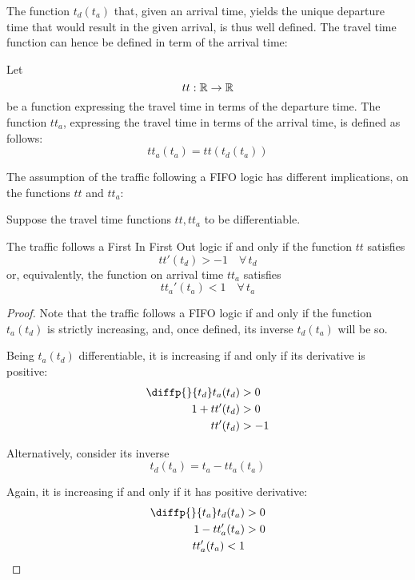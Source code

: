The function \(t_d(t_a)\) that, given an arrival time,
yields the unique departure time that would result in the given arrival,
is thus well defined.
The travel time function can hence be defined in term of the arrival time:
\begin{definition}
  \label{def:tta}
  Let
  \begin{equation*}
    tt:\mathbb{R} \rightarrow \mathbb{R}
  \end{equation*}
  be a function expressing the travel time in terms of the departure time.
  The function \(tt_a\), expressing the travel time in terms of the arrival time, is defined as follows:
  \begin{equation*}
    tt_a(t_a) = tt(t_d(t_a))
  \end{equation*}
\end{definition}

The assumption of the traffic following a FIFO logic has different implications,
on the functions \(tt\) and \(tt_a\):

\begin{lemma}
  \label{lemma:bounded-der-tt}
  Suppose the travel time functions \(tt, tt_a\) to be differentiable.
  
  The traffic follows a First In First Out logic if and only if the function \(tt\) satisfies
  \begin{equation*}
    tt'(t_d) > -1\quad \forall \, t_d
  \end{equation*}
  or, equivalently, the function on arrival time \(tt_a\) satisfies
  \begin{equation*}
    tt_a'(t_a) < 1\quad \forall \, t_a
  \end{equation*}
\end{lemma}
\begin{proof}
  Note that the traffic follows a FIFO logic if and only if the function \(t_a(t_d)\) is strictly increasing,
  and, once defined, its inverse \(t_d(t_a)\) will be so.
  
  Being \(t_a(t_d)\) differentiable, it is increasing if and only if its derivative is positive:
  \begin{align*}
    \diffp{}{{t_d}} t_a(t_d) & > 0 \\
    1 + tt'(t_d) & > 0 \\
    tt'(t_d) & > -1
  \end{align*}
  
  Alternatively, consider its inverse
  \begin{equation*}
    t_d(t_a) = t_a - tt_a(t_a)
  \end{equation*}

  Again, it is increasing if and only if it has positive derivative:
  \begin{align*}
    \diffp{}{{t_a}} t_d(t_a) & > 0 \\
    1 - tt_a'(t_a) & > 0 \\
    tt_a'(t_a) < 1
  \end{align*}
\end{proof}

